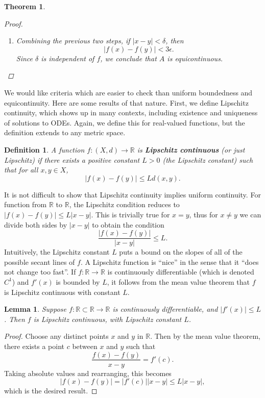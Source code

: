 \documentclass[12pt]{amsart}         %
\newtheorem{definition}{Definition}[section]
\newtheorem{theorem}{Theorem}[section]
\newtheorem{lemma}{Lemma}[section]
\theoremstyle{remark}
\newcommand{\R}{\mathbb{R}}
\begin{document}
\begin{theorem}
\begin{proof}
\begin{enumerate}
\[
\max_{j = 1, \dots, n(\epsilon)}|f_j^\epsilon(x) - f_j^\epsilon(y)| < \epsilon.
\]
\item Combining the previous two steps, if $|x - y| < \delta$, then
\[
|f(x) - f(y)| < 3 \epsilon.
\]
Since $\delta$ is independent of $f$, we conclude that $A$ is equicontinuous.
\end{enumerate}
\end{proof}
\end{theorem}

We would like criteria which are easier to check than uniform boundedness and equicontinuity. Here are some results of that nature. First, we define Lipschitz continuity, which shows up in many contexts, including existence and uniqueness of solutions to ODEs. Again, we define this for real-valued functions, but the definition extends to any metric space.

\begin{definition}
A function $f: (X, d) \rightarrow \R$ is \textbf{Lipschitz continuous} (or just Lipschitz) if there exists a positive constant $L > 0$ (the Lipschitz constant) such that for all $x, y \in X$,
\[
|f(x) - f(y)| \leq L d(x, y).
\]
\end{definition}
It is not difficult to show that Lipschitz continuity implies uniform continuity. For function from $\R$ to $\R$, the Lipschitz condition reduces to $|f(x) - f(y)| \leq L|x-y|$. This is trivially true for $x = y$, thus for $x \neq y$ we can divide both sides by $|x - y|$ to obtain the condition
\[
\frac{|f(x) - f(y)|}{|x-y|} \leq L.
\]
Intuitively, the Lipschitz constant $L$ puts a bound on the slopes of all of the possible secant lines of $f$. A Lipschitz function is ``nice'' in the sense that it ``does not change too fast''. If $f: \R \rightarrow \R$ is continuously differentiable (which is denoted $C^1$) and $f'(x)$ is bounded by $L$, it follows from the mean value theorem that $f$ is Lipschitz continuous with constant $L$. 

\begin{lemma}Suppose $f: \R\subset \R \rightarrow \R$ is continuously differentiable, and $|f'(x)| \leq L$. Then $f$ is Lipschitz continuous, with Lipschitz constant $L$. 
\end{lemma}
\begin{proof}
Choose any distinct points $x$ and $y$ in $\R$. Then by the mean value theorem, there exists a point $c$ between $x$ and $y$ such that
\[
\frac{f(x)-f(y)}{x-y} = f'(c).
\]
Taking absolute values and rearranging, this becomes
\[
|f(x)-f(y)| = |f'(c)||x-y| \leq L |x-y|,
\]
which is the desired result.
\end{proof}
\end{document}

